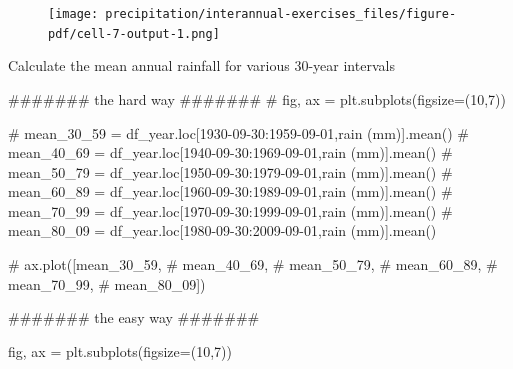 \documentclass[
  letterpaper,
  DIV=11,
  numbers=noendperiod]{scrreprt}
\newenvironment{Shaded}{\begin{snugshade}}{\end{snugshade}}
\newcommand{\CommentTok}[1]{\textcolor[rgb]{0.37,0.37,0.37}{#1}}
\newcommand{\DecValTok}[1]{\textcolor[rgb]{0.68,0.00,0.00}{#1}}
\newcommand{\NormalTok}[1]{\textcolor[rgb]{0.00,0.23,0.31}{#1}}
\newcommand{\OperatorTok}[1]{\textcolor[rgb]{0.37,0.37,0.37}{#1}}
\begin{document}
\begin{figure}[H]

{\centering \texttt{[image: precipitation/interannual-exercises\_files/figure-pdf/cell-7-output-1.png]}

}

\end{figure}

Calculate the mean annual rainfall for various 30-year intervals

\begin{Shaded}
\begin{Highlighting}[]
\CommentTok{\#\#\#\#\#\#\# the hard way \#\#\#\#\#\#\#}
\CommentTok{\# fig, ax = plt.subplots(figsize=(10,7))}

\CommentTok{\# mean\_30\_59 = df\_year.loc[\textquotesingle{}1930{-}09{-}30\textquotesingle{}:\textquotesingle{}1959{-}09{-}01\textquotesingle{},\textquotesingle{}rain (mm)\textquotesingle{}].mean()}
\CommentTok{\# mean\_40\_69 = df\_year.loc[\textquotesingle{}1940{-}09{-}30\textquotesingle{}:\textquotesingle{}1969{-}09{-}01\textquotesingle{},\textquotesingle{}rain (mm)\textquotesingle{}].mean()}
\CommentTok{\# mean\_50\_79 = df\_year.loc[\textquotesingle{}1950{-}09{-}30\textquotesingle{}:\textquotesingle{}1979{-}09{-}01\textquotesingle{},\textquotesingle{}rain (mm)\textquotesingle{}].mean()}
\CommentTok{\# mean\_60\_89 = df\_year.loc[\textquotesingle{}1960{-}09{-}30\textquotesingle{}:\textquotesingle{}1989{-}09{-}01\textquotesingle{},\textquotesingle{}rain (mm)\textquotesingle{}].mean()}
\CommentTok{\# mean\_70\_99 = df\_year.loc[\textquotesingle{}1970{-}09{-}30\textquotesingle{}:\textquotesingle{}1999{-}09{-}01\textquotesingle{},\textquotesingle{}rain (mm)\textquotesingle{}].mean()}
\CommentTok{\# mean\_80\_09 = df\_year.loc[\textquotesingle{}1980{-}09{-}30\textquotesingle{}:\textquotesingle{}2009{-}09{-}01\textquotesingle{},\textquotesingle{}rain (mm)\textquotesingle{}].mean()}

\CommentTok{\# ax.plot([mean\_30\_59,}
\CommentTok{\#          mean\_40\_69,}
\CommentTok{\#          mean\_50\_79,}
\CommentTok{\#          mean\_60\_89,}
\CommentTok{\#          mean\_70\_99,}
\CommentTok{\#          mean\_80\_09])}


\CommentTok{\#\#\#\#\#\#\# the easy way \#\#\#\#\#\#\#}

\NormalTok{fig, ax }\OperatorTok{=}\NormalTok{ plt.subplots(figsize}\OperatorTok{=}\NormalTok{(}\DecValTok{10}\NormalTok{,}\DecValTok{7}\NormalTok{))}


\end{Highlighting}
\end{Shaded}
\end{document}
